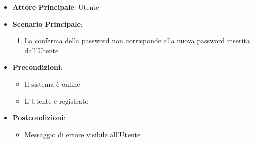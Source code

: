 \begin{itemize}
    \item \textbf{Attore Principale}: Utente
    \item \textbf{Scenario Principale}:
    \begin{enumerate}
        \item La conferma della password non corrisponde alla nuova password inserita dall'Utente
    \end{enumerate}
    \item \textbf{Precondizioni}:
    \begin{itemize}
        \item Il sistema è online
        \item L'Utente è registrato
    \end{itemize}
    \item \textbf{Postcondizioni}:
    \begin{itemize}
        \item Messaggio di errore visibile all'Utente
    \end{itemize}
\end{itemize}